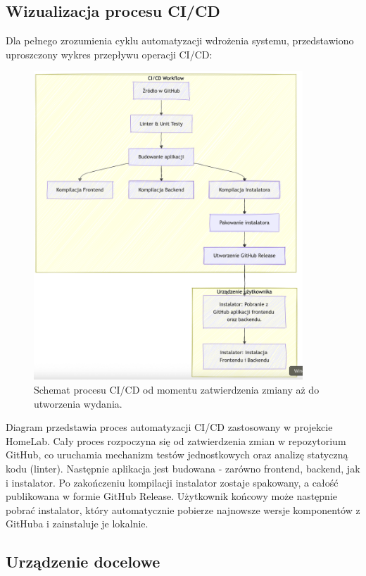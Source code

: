 \subsection{Wizualizacja procesu CI/CD}
Dla pełnego zrozumienia cyklu automatyzacji wdrożenia systemu, przedstawiono uproszczony wykres przepływu operacji CI/CD:
\begin{figure}[H]
    \centering
    \includegraphics[width=0.90\textwidth]{./chapters/mermeid/schematcicd.png}
    \caption{Schemat procesu CI/CD od momentu zatwierdzenia zmiany aż do utworzenia wydania.}
    \label{fig:ci_cd_pipeline}
\end{figure}

Diagram przedstawia proces automatyzacji CI/CD zastosowany w projekcie HomeLab. Cały proces rozpoczyna się od zatwierdzenia zmian w repozytorium GitHub, co uruchamia mechanizm testów jednostkowych oraz analizę statyczną kodu (linter). Następnie aplikacja jest budowana - zarówno frontend, backend, jak i instalator. Po zakończeniu kompilacji instalator zostaje spakowany, a całość publikowana w formie GitHub Release. Użytkownik końcowy może następnie pobrać instalator, który automatycznie pobierze najnowsze wersje komponentów z GitHuba i zainstaluje je lokalnie.

\subsection{Urządzenie docelowe}

